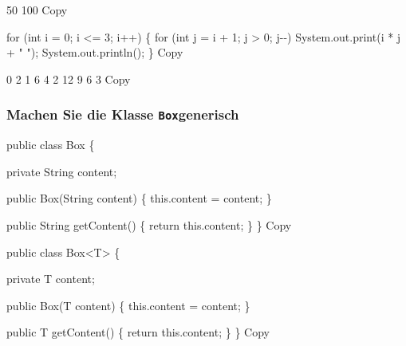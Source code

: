 \documentclass[
]{article}
\newenvironment{Shaded}{}{}
\newcommand{\NormalTok}[1]{#1}
\begin{document}
\begin{Shaded}
\begin{Highlighting}[]
\NormalTok{50}
\NormalTok{100}
\NormalTok{Copy}
\end{Highlighting}
\end{Shaded}

\begin{Shaded}
\begin{Highlighting}[]
\NormalTok{for (int i = 0; i \textless{}= 3; i++) \{}
\NormalTok{    for (int j = i + 1; j \textgreater{} 0; j{-}{-})}
\NormalTok{        System.out.print(i * j + " ");}
\NormalTok{    System.out.println();}
\NormalTok{\}}
\NormalTok{Copy}
\end{Highlighting}
\end{Shaded}

\begin{Shaded}
\begin{Highlighting}[]
\NormalTok{0}
\NormalTok{2 1}
\NormalTok{6 4 2}
\NormalTok{12 9 6 3}
\NormalTok{Copy}
\end{Highlighting}
\end{Shaded}

\subsubsection{\texorpdfstring{Machen Sie die Klasse
\texttt{Box}generisch}{Machen Sie die Klasse Boxgenerisch}}\label{machen-sie-die-klasse-boxgenerisch}

\begin{Shaded}
\begin{Highlighting}[]
\NormalTok{public class Box \{}

\NormalTok{    private String content;}
    
\NormalTok{    public Box(String content) \{}
\NormalTok{        this.content = content;}
\NormalTok{    \}}
    
\NormalTok{    public String getContent() \{}
\NormalTok{        return this.content;}
\NormalTok{    \}}
\NormalTok{\}}
\NormalTok{Copy}
\end{Highlighting}
\end{Shaded}

\begin{Shaded}
\begin{Highlighting}[]
\NormalTok{public class Box\textless{}T\textgreater{} \{}

\NormalTok{    private T content;}
    
\NormalTok{    public Box(T content) \{}
\NormalTok{        this.content = content;}
\NormalTok{    \}}
    
\NormalTok{    public T getContent() \{}
\NormalTok{        return this.content;}
\NormalTok{    \}}
\NormalTok{\}}
\NormalTok{Copy}
\end{Highlighting}
\end{Shaded}
\end{document}
